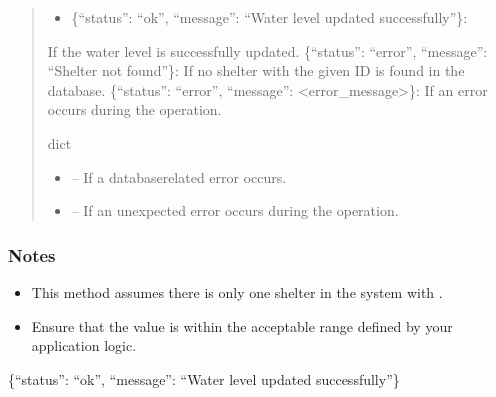 \documentclass[letterpaper,10pt,english]{sphinxmanual}
\begin{document}
\begin{fulllineitems}
\begin{fulllineitems}
\begin{quote}
\begin{description}
\sphinxAtStartPar
\begin{description}
\begin{itemize}
\item {} 
\sphinxAtStartPar
\{“status”: “ok”, “message”: “Water level updated successfully”\}:

\end{itemize}

\sphinxAtStartPar
If the water level is successfully updated.
\sphinxhyphen{} \{“status”: “error”, “message”: “Shelter not found”\}:
If no shelter with the given ID is found in the database.
\sphinxhyphen{} \{“status”: “error”, “message”: <error\_message>\}:
If an error occurs during the operation.

\end{description}


\sphinxAtStartPar
dict

\begin{itemize}
\item {} 
\sphinxAtStartPar
{} – If a database\sphinxhyphen{}related error occurs.

\item {} 
\sphinxAtStartPar
{} – If an unexpected error occurs during the operation.

\end{itemize}

\end{description}\end{quote}
\subsubsection*{Notes}
\begin{itemize}
\item {} 
\sphinxAtStartPar
This method assumes there is only one shelter in the system with .

\item {} 
\sphinxAtStartPar
Ensure that the  value is within the acceptable range defined by your application logic.

\end{itemize}
\begin{description}
\sphinxAtStartPar
\{“status”: “ok”, “message”: “Water level updated successfully”\}

\end{description}

\end{fulllineitems}


\end{fulllineitems}
\end{document}
